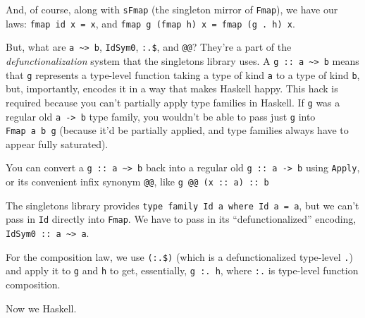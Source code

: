 \documentclass[]{article}
\begin{document}
And, of course, along with \texttt{sFmap} (the singleton mirror of
\texttt{Fmap}), we have our laws: \texttt{fmap\ id\ x\ =\ x}, and
\texttt{fmap\ g\ (fmap\ h)\ x\ =\ fmap\ (g\ .\ h)\ x}.

But, what are \texttt{a\ \textasciitilde{}\textgreater{}\ b}, \texttt{IdSym0},
\texttt{:.\$}, and \texttt{@@}? They're a part of the \emph{defunctionalization}
system that the singletons library uses. A
\texttt{g\ ::\ a\ \textasciitilde{}\textgreater{}\ b} means that \texttt{g}
represents a type-level function taking a type of kind \texttt{a} to a type of
kind \texttt{b}, but, importantly, encodes it in a way that makes Haskell happy.
This hack is required because you can't partially apply type families in
Haskell. If \texttt{g} was a regular old \texttt{a\ -\textgreater{}\ b} type
family, you wouldn't be able to pass just \texttt{g} into \texttt{Fmap\ a\ b\ g}
(because it'd be partially applied, and type families always have to appear
fully saturated).

You can convert a \texttt{g\ ::\ a\ \textasciitilde{}\textgreater{}\ b} back
into a regular old \texttt{g\ ::\ a\ -\textgreater{}\ b} using \texttt{Apply},
or its convenient infix synonym \texttt{@@}, like
\texttt{g\ @@\ (x\ ::\ a)\ ::\ b}

The singletons library provides
\texttt{type\ family\ Id\ a\ where\ Id\ a\ =\ a}, but we can't pass in
\texttt{Id} directly into \texttt{Fmap}. We have to pass in its
``defunctionalized'' encoding,
\texttt{IdSym0\ ::\ a\ \textasciitilde{}\textgreater{}\ a}.

For the composition law, we use \texttt{(:.\$)} (which is a defunctionalized
type-level \texttt{.}) and apply it to \texttt{g} and \texttt{h} to get,
essentially, \texttt{g\ :.\ h}, where \texttt{:.} is type-level function
composition.

Now we Haskell.
\end{document}

